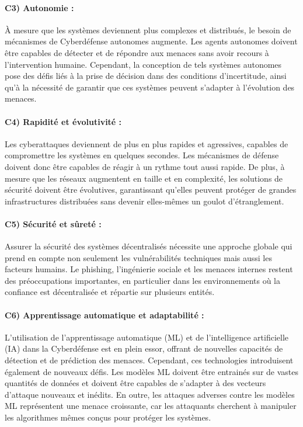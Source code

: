 \paragraph{C3) Autonomie :}
À mesure que les systèmes deviennent plus complexes et distribués, le besoin de mécanismes de Cyberdéfense autonomes augmente. Les agents autonomes doivent être capables de détecter et de répondre aux menaces sans avoir recours à l'intervention humaine. Cependant, la conception de tels systèmes autonomes pose des défis liés à la prise de décision dans des conditions d'incertitude, ainsi qu'à la nécessité de garantir que ces systèmes peuvent s'adapter à l'évolution des menaces.

\paragraph{C4) Rapidité et évolutivité :}
Les cyberattaques deviennent de plus en plus rapides et agressives, capables de compromettre les systèmes en quelques secondes. Les mécanismes de défense doivent donc être capables de réagir à un rythme tout aussi rapide. De plus, à mesure que les réseaux augmentent en taille et en complexité, les solutions de sécurité doivent être évolutives, garantissant qu'elles peuvent protéger de grandes infrastructures distribuées sans devenir elles-mêmes un goulot d'étranglement.

\paragraph{C5) Sécurité et sûreté :}
Assurer la sécurité des systèmes décentralisés nécessite une approche globale qui prend en compte non seulement les vulnérabilités techniques mais aussi les facteurs humains. Le phishing, l'ingénierie sociale et les menaces internes restent des préoccupations importantes, en particulier dans les environnements où la confiance est décentralisée et répartie sur plusieurs entités.

\paragraph{C6) Apprentissage automatique et adaptabilité :}
L'utilisation de l'apprentissage automatique (ML) et de l'intelligence artificielle (IA) dans la Cyberdéfense est en plein essor, offrant de nouvelles capacités de détection et de prédiction des menaces. Cependant, ces technologies introduisent également de nouveaux défis. Les modèles ML doivent être entrainés sur de vastes quantités de données et doivent être capables de s'adapter à des vecteurs d'attaque nouveaux et inédits. En outre, les attaques adverses contre les modèles ML représentent une menace croissante, car les attaquants cherchent à manipuler les algorithmes mêmes conçus pour protéger les systèmes.

